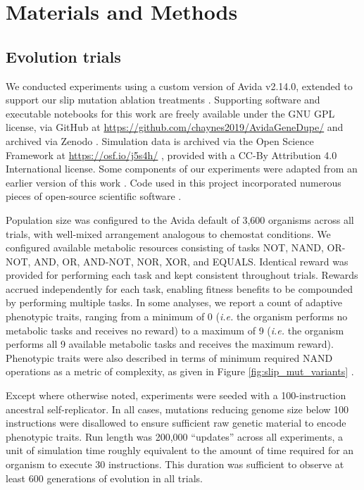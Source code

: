 \section{Materials and Methods} \label{sec:methods}

\subsection{Evolution trials}

We conducted experiments using a custom version of Avida v2.14.0, extended to support our slip mutation ablation treatments \citep{Ofria:2009avida}.
Supporting software and executable notebooks for this work are freely available under the GNU GPL license, via GitHub at \url{https://github.com/chaynes2019/AvidaGeneDupe/} and archived via Zenodo \citep{haynes_2025,https://doi.org/10.25495/7gxk-rd71}.
Simulation data is archived via the Open Science Framework at \url{https://osf.io/j5s4h/} \citep{Moreno_Haynes_2025,foster2017open}, provided with a CC-By Attribution 4.0 International license.
Some components of our experiments were adapted from an earlier version of this work \citep{lalejini2017gene}.
Code used in this project incorporated numerous pieces of open-source scientific software \citep{2020SciPy-NMeth,harris2020array,reback2020pandas,mckinney-proc-scipy-2010,waskom2021seaborn,hunter2007matplotlib,moreno2023teeplot,r_core_team_r:_2015}.

Population size was configured to the Avida default of 3,600 organisms across all trials, with well-mixed arrangement analogous to chemostat conditions.
We configured available metabolic resources consisting of tasks NOT, NAND, OR-NOT, AND, OR, AND-NOT, NOR, XOR, and EQUALS.
Identical reward was provided for performing each task and kept consistent throughout trials.
Rewards accrued independently for each task, enabling fitness benefits to be compounded by performing multiple tasks.
In some analyses, we report a count of adaptive phenotypic traits, ranging from a minimum of 0 (\textit{i.e.} the organism performs no metabolic tasks and receives no reward) to a maximum of 9 (\textit{i.e.} the organism performs all 9 available metabolic tasks and receives the maximum reward).
Phenotypic traits were also described in terms of minimum required NAND operations as a metric of complexity, as given in Figure \ref{fig:slip_mut_variants} \citep{Lenski2003Evolutionary}.

Except where otherwise noted, experiments were seeded with a 100-instruction ancestral self-replicator.
In all cases, mutations reducing genome size below 100 instructions were disallowed to ensure sufficient raw genetic material to encode phenotypic traits.
Run length was 200,000 ``updates'' across all experiments, a unit of simulation time roughly equivalent to the amount of time required for an organism to execute 30 instructions.
This duration was sufficient to observe at least 600 generations of evolution in all trials.

